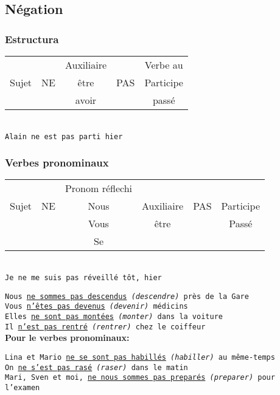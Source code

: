 \documentclass[letterpaper,12pt]{article}
\begin{document}
\begin{sloppypar}
\subsection{Négation}
\subsubsection{Estructura}
\begin{center}
    \begin{tabular}{|c|c|c|c|c|} \hline
                &    & Auxiliaire &  & Verbe au \\
        Sujet& NE &  être &  PAS & Participe \\ 
                &    &  avoir &     & passé \\  
        \hline
    \end{tabular}
    \vspace{0.3cm}\\ 
    \texttt{Alain ne est pas parti hier}
\end{center}
\subsubsection{Verbes pronominaux}
\begin{center}
    \begin{tabular}{|c|c|c|c|c|c|} \hline
             && Pronom réflechi &&& \\
        Sujet&NE&Nous&Auxiliaire&PAS&Participe\\ 
             &&Vous&être&&Passé \\  
             &&Se&&& \\
\hline
\end{tabular}
\vspace{0.3cm}\\ 
\texttt{Je ne me suis pas réveillé tôt, hier}
\end{center}

\texttt{Nous \underline{ne sommes pas descendus} \textit{(descendre)} près de la Gare \\ Vous \underline{n'êtes pas devenus} \textit{(devenir)} médicins \\ Elles \underline{ne sont pas montées} \textit{(monter)} dans la voiture \\ Il \underline{n'est pas rentré} \textit{(rentrer)} chez le coiffeur}
\vspace{0.3cm}\\ 
\textbf{Pour le verbes pronominaux: }

\texttt{Lina et Mario \underline{ne se sont pas habillés} \textit{(habiller)} au même-temps \\ On \underline{ne s'est pas rasé} \textit{(raser)} dans le matin \\ Mari, Sven et moi, \underline{ne nous sommes pas preparés} \textit{(preparer)} pour l'examen}


\end{sloppypar}
\end{document}
